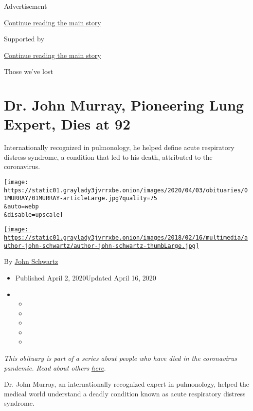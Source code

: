 Advertisement

\protect\hyperlink{after-top}{Continue reading the main story}

Supported by

\protect\hyperlink{after-sponsor}{Continue reading the main story}

Those we've lost

\hypertarget{dr-john-murray-pioneering-lung-expert-dies-at-92}{%
\section{Dr. John Murray, Pioneering Lung Expert, Dies at
92}\label{dr-john-murray-pioneering-lung-expert-dies-at-92}}

Internationally recognized in pulmonology, he helped define acute
respiratory distress syndrome, a condition that led to his death,
attributed to the coronavirus.

\texttt{[image: https://static01.graylady3jvrrxbe.onion/images/2020/04/03/obituaries/01MURRAY/01MURRAY-articleLarge.jpg?quality=75\\\&auto=webp\\\&disable=upscale]}

\href{https://www.nytimes3xbfgragh.onion/by/john-schwartz}{\texttt{[image: https://static01.graylady3jvrrxbe.onion/images/2018/02/16/multimedia/author-john-schwartz/author-john-schwartz-thumbLarge.jpg]}}

By \href{https://www.nytimes3xbfgragh.onion/by/john-schwartz}{John
Schwartz}

\begin{itemize}
\item
  Published April 2, 2020Updated April 16, 2020
\item
  \begin{itemize}
  \item
  \item
  \item
  \item
  \item
  \end{itemize}
\end{itemize}

\emph{This obituary is part of a series about people who have died in
the coronavirus pandemic. Read about others}
\href{https://www.nytimes3xbfgragh.onion/series/people-who-have-died-of-the-coronavirus}{\emph{here}}\emph{.}

Dr. John Murray, an internationally recognized expert in pulmonology,
helped the medical world understand a deadly condition known as acute
respiratory distress syndrome.

